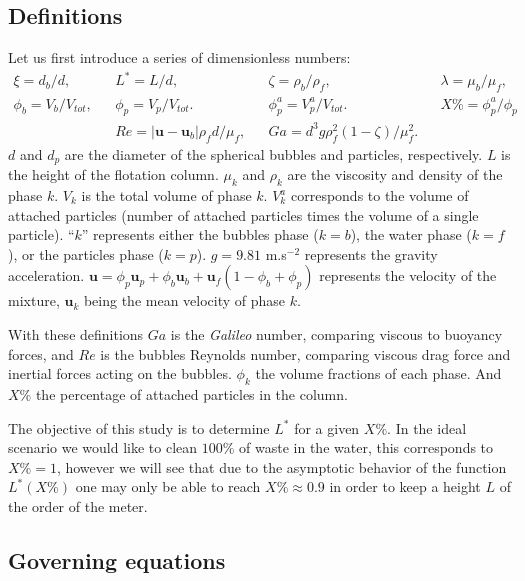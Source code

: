 \subsection{Definitions}
Let us first introduce a series of dimensionless numbers: 
\begin{align*}
    \xi = d_b / d,
    && L^* = L / d,
    && \zeta = \rho_b / \rho_f,
    && \lambda = \mu_b / \mu_f,\\
    \phi_b = V_b/V_{tot},
    && \phi_p = V_p/V_{tot}.
    && \phi_p^a = V_p^a/V_{tot}.
    && X\% = \phi_p^a /\phi_p\\
    &&
    Re = |\textbf{u} - \textbf{u}_b|\rho_f d /\mu_f ,
    && Ga = d^3 g\rho_f^2 (1-\zeta)/\mu_f^2. 
\end{align*}
$d$ and $d_p$ are the diameter of the spherical bubbles and particles, respectively.
$L$ is the height of the flotation column. 
$\mu_k$  and $\rho_k$ are the viscosity and density of the phase $k$. 
$V_k$ is the total volume of phase $k$. 
$V^a_k$ corresponds to the volume of attached particles (number of attached particles times the volume of a single particle). 
``$k$'' represents either the bubbles phase ($k=b$), the water phase ($k=f$), or the particles phase ($k=p$).
$g = 9.81$ m.s$^{-2}$ represents the gravity acceleration. 
$\textbf{u} = \phi_p \textbf{u}_p + \phi_b \textbf{u}_b + \textbf{u}_f(1-\phi_b+\phi_p)$ represents the velocity of the mixture, $\textbf{u}_k$ being the mean velocity of phase $k$.

With these definitions $Ga$ is the \textit{Galileo} number, comparing viscous to buoyancy forces, and $Re$ is the bubbles Reynolds number, comparing viscous drag force and inertial forces acting on the bubbles.
$\phi_k$ the volume fractions of each phase. 
And $X\% $ the percentage of attached particles in the column. 

The objective of this study is to determine $L^*$ for a given $X\%$.
In the ideal scenario we would like to clean $100\%$ of waste in the water, this corresponds to $X\%=1$, however we will see that due to the asymptotic behavior of the function $L^* (X\%)$ one may only be able to reach $X\% \approx 0.9$ in order to keep a height $L$ of the order of the meter. 

\subsection{Governing equations}

